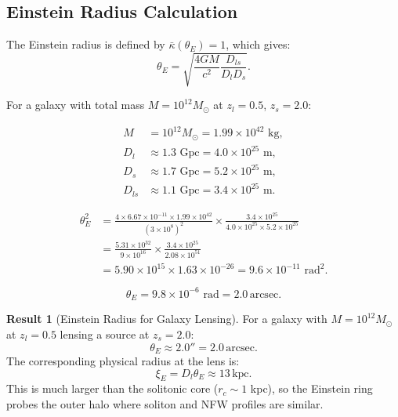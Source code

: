 \documentclass[11pt,a4paper]{article}
\newcommand{\ee}[1]{\times 10^{#1}}
\newcommand{\kpc}{\ensuremath{\mathrm{kpc}}}
\newcommand{\arcsec}{\ensuremath{\mathrm{arcsec}}}
\theoremstyle{definition}
\newtheorem{result}{Result}[section]
\theoremstyle{remark}
\begin{document}
\subsection{Einstein Radius Calculation}
\label{sec:einstein_radius}

The Einstein radius is defined by $\bar{\kappa}(\theta_E) = 1$, which gives:
\begin{equation}
\theta_E = \sqrt{\frac{4GM}{c^2} \frac{D_{ls}}{D_l D_s}}.
\end{equation}

For a galaxy with total mass $M = 10^{12} M_\odot$ at $z_l = 0.5$, $z_s = 2.0$:

\begin{align}
M &= 10^{12} M_\odot = 1.99 \ee{42} \text{ kg}, \\
D_l &\approx 1.3 \text{ Gpc} = 4.0 \ee{25} \text{ m}, \\
D_s &\approx 1.7 \text{ Gpc} = 5.2 \ee{25} \text{ m}, \\
D_{ls} &\approx 1.1 \text{ Gpc} = 3.4 \ee{25} \text{ m}.
\end{align}

\begin{align}
\theta_E^2 &= \frac{4 \times 6.67 \ee{-11} \times 1.99 \ee{42}}{(3 \ee{8})^2} \times \frac{3.4 \ee{25}}{4.0 \ee{25} \times 5.2 \ee{25}} \\
&= \frac{5.31 \ee{32}}{9 \ee{16}} \times \frac{3.4 \ee{25}}{2.08 \ee{51}} \\
&= 5.90 \ee{15} \times 1.63 \ee{-26} = 9.6 \ee{-11} \text{ rad}^2.
\end{align}

\begin{equation}
\theta_E = 9.8 \ee{-6} \text{ rad} = 2.0 \, \arcsec.
\end{equation}

\begin{result}[Einstein Radius for Galaxy Lensing]
For a galaxy with $M = 10^{12} M_\odot$ at $z_l = 0.5$ lensing a source at $z_s = 2.0$:
\begin{equation}
\boxed{\theta_E \approx 2.0'' = 2.0 \, \arcsec.}
\end{equation}
The corresponding physical radius at the lens is:
\begin{equation}
\xi_E = D_l \theta_E \approx 13 \, \kpc.
\end{equation}
This is much larger than the solitonic core ($r_c \sim 1$ kpc), so the Einstein ring probes the outer halo where soliton and NFW profiles are similar.
\end{result}
\end{document}

